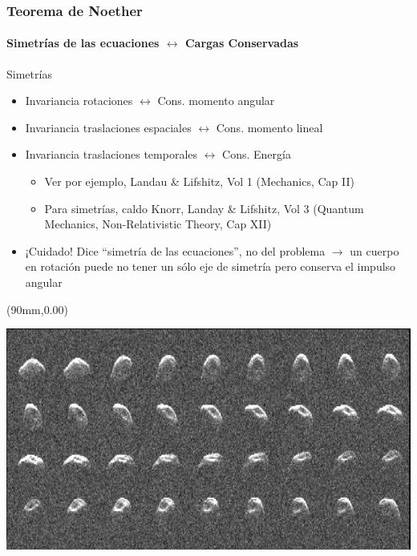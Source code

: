 \documentclass[xetex,mathserif,serif,10pt]{beamer}
\begin{document}
\begin{frame}
	\frametitle{Teorema de Noether}
  \framesubtitle{\alert{Simetrías de las ecuaciones $\leftrightarrow$ Cargas Conservadas}}
  \begin{block}{Simetrías}
			\begin{itemize}
        \item Invariancia rotaciones $\leftrightarrow$ Cons. momento angular
        \item Invariancia traslaciones espaciales $\leftrightarrow$ Cons. momento lineal
        \item Invariancia traslaciones temporales $\leftrightarrow$ Cons. Energía
			  \begin{itemize}
          \item Ver por ejemplo, Landau \& Lifshitz, Vol 1 (Mechanics, Cap II)
          \item Para simetrías, caldo Knorr, Landay \& Lifshitz, Vol 3 (Quantum Mechanics, Non-Relativistic Theory, Cap XII)
        \end{itemize}
        \item ¡Cuidado! Dice ``simetría de las ecuaciones'', no del problema $\rightarrow$ un cuerpo en rotación puede no tener un sólo eje de simetría pero conserva el impulso angular
      \end{itemize}
    \end{block}
    \begin{alertblock}{}
  \end{alertblock}
  \begin{textblock*}{35mm}(90mm,0.00\textheight)
    \begin{exampleblock}{}
      {\centering \includegraphics[width=1.00\columnwidth]{./figs/u01/asteroid-rotation.jpg}}
    \end{exampleblock}
  \end{textblock*}
\end{frame}
\end{document}
